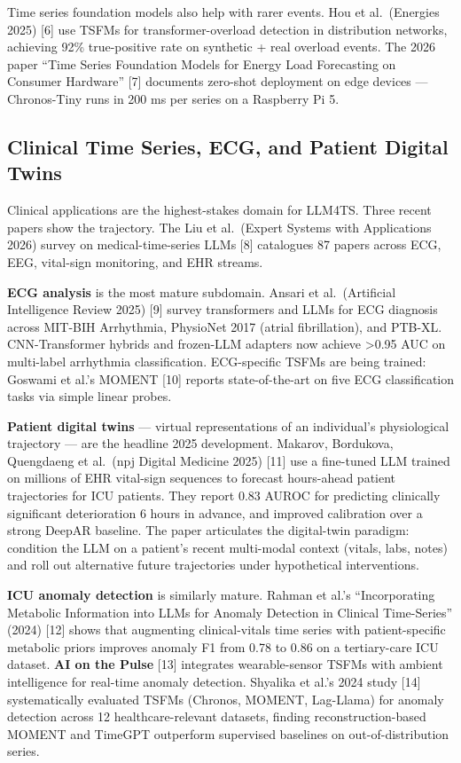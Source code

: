 \documentclass{article}
\begin{document}
Time series foundation models also help with rarer events. Hou et al.~(Energies 2025) {[}6{]} use TSFMs for transformer-overload detection in distribution networks, achieving 92\% true-positive rate on synthetic + real overload events. The 2026 paper ``Time Series Foundation Models for Energy Load Forecasting on Consumer Hardware'' {[}7{]} documents zero-shot deployment on edge devices --- Chronos-Tiny runs in 200 ms per series on a Raspberry Pi 5.

\subsection{Clinical Time Series, ECG, and Patient Digital Twins}\label{clinical-time-series-ecg-and-patient-digital-twins}

Clinical applications are the highest-stakes domain for LLM4TS. Three recent papers show the trajectory. The Liu et al.~(Expert Systems with Applications 2026) survey on medical-time-series LLMs {[}8{]} catalogues 87 papers across ECG, EEG, vital-sign monitoring, and EHR streams.

\textbf{ECG analysis} is the most mature subdomain. Ansari et al.~(Artificial Intelligence Review 2025) {[}9{]} survey transformers and LLMs for ECG diagnosis across MIT-BIH Arrhythmia, PhysioNet 2017 (atrial fibrillation), and PTB-XL. CNN-Transformer hybrids and frozen-LLM adapters now achieve \textgreater0.95 AUC on multi-label arrhythmia classification. ECG-specific TSFMs are being trained: Goswami et al.'s MOMENT {[}10{]} reports state-of-the-art on five ECG classification tasks via simple linear probes.

\textbf{Patient digital twins} --- virtual representations of an individual's physiological trajectory --- are the headline 2025 development. Makarov, Bordukova, Quengdaeng et al.~(npj Digital Medicine 2025) {[}11{]} use a fine-tuned LLM trained on millions of EHR vital-sign sequences to forecast hours-ahead patient trajectories for ICU patients. They report 0.83 AUROC for predicting clinically significant deterioration 6 hours in advance, and improved calibration over a strong DeepAR baseline. The paper articulates the digital-twin paradigm: condition the LLM on a patient's recent multi-modal context (vitals, labs, notes) and roll out alternative future trajectories under hypothetical interventions.

\textbf{ICU anomaly detection} is similarly mature. Rahman et al.'s ``Incorporating Metabolic Information into LLMs for Anomaly Detection in Clinical Time-Series'' (2024) {[}12{]} shows that augmenting clinical-vitals time series with patient-specific metabolic priors improves anomaly F1 from 0.78 to 0.86 on a tertiary-care ICU dataset. \textbf{AI on the Pulse} \citep{gabrielli20252025} {[}13{]} integrates wearable-sensor TSFMs with ambient intelligence for real-time anomaly detection. Shyalika et al.'s 2024 study {[}14{]} systematically evaluated TSFMs (Chronos, MOMENT, Lag-Llama) for anomaly detection across 12 healthcare-relevant datasets, finding reconstruction-based MOMENT and TimeGPT outperform supervised baselines on out-of-distribution series.
\end{document}

